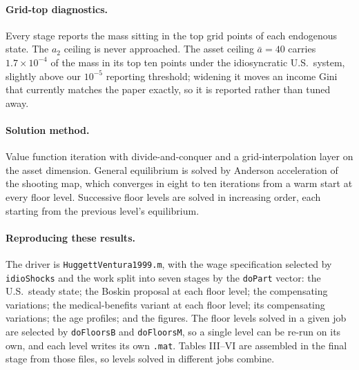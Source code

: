 \documentclass[11pt,fleqn]{article}
\begin{document}
\paragraph{Grid-top diagnostics.} Every stage reports the mass sitting in the top grid points
of each endogenous state. The $a_2$ ceiling is never approached. The asset ceiling
$\bar{a}=40$ carries $1.7\times10^{-4}$ of the mass in its top ten points under the
idiosyncratic U.S.\ system, slightly above our $10^{-5}$ reporting threshold; widening it
moves an income Gini that currently matches the paper exactly, so it is reported rather than
tuned away.

\paragraph{Solution method.} Value function iteration with divide-and-conquer and a
grid-interpolation layer on the asset dimension. General equilibrium is solved by Anderson
acceleration of the shooting map, which converges in eight to ten iterations from a warm start
at every floor level. Successive floor levels are solved in increasing order, each starting
from the previous level's equilibrium.

\paragraph{Reproducing these results.} The driver is \texttt{HuggettVentura1999.m}, with the
wage specification selected by \texttt{idioShocks} and the work split into seven stages by the
\texttt{doPart} vector: the U.S.\ steady state; the Boskin proposal at each floor level; the
compensating variations; the medical-benefits variant at each floor level; its compensating
variations; the age profiles; and the figures. The floor levels solved in a given job are
selected by \texttt{doFloorsB} and \texttt{doFloorsM}, so a single level can be re-run on its
own, and each level writes its own \texttt{.mat}. Tables III--VI are assembled in the final
stage from those files, so levels solved in different jobs combine.
\end{document}
